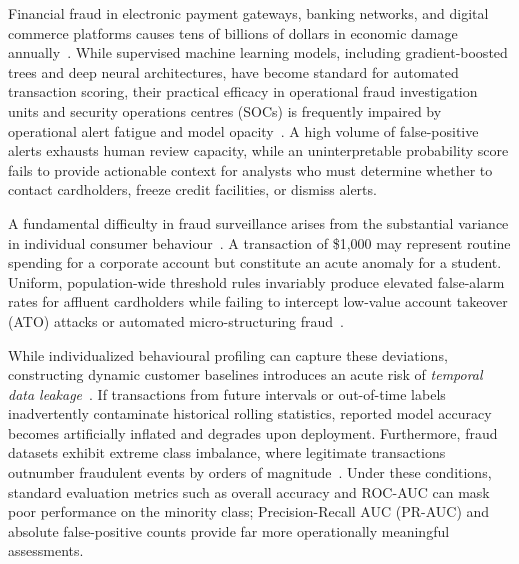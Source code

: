 \documentclass[conference]{IEEEtran}
\begin{document}
Financial fraud in electronic payment gateways, banking networks, and digital commerce platforms causes tens of billions of dollars in economic damage annually~\cite{sarna2026ai}. While supervised machine learning models, including gradient-boosted trees and deep neural architectures, have become standard for automated transaction scoring, their practical efficacy in operational fraud investigation units and security operations centres (SOCs) is frequently impaired by operational alert fatigue and model opacity~\cite{lipton2016mythos,chan2015using}. A high volume of false-positive alerts exhausts human review capacity, while an uninterpretable probability score fails to provide actionable context for analysts who must determine whether to contact cardholders, freeze credit facilities, or dismiss alerts.

A fundamental difficulty in fraud surveillance arises from the substantial variance in individual consumer behaviour~\cite{bolton2002unsupervised}. A transaction of \$1,000 may represent routine spending for a corporate account but constitute an acute anomaly for a student. Uniform, population-wide threshold rules invariably produce elevated false-alarm rates for affluent cardholders while failing to intercept low-value account takeover (ATO) attacks or automated micro-structuring fraud~\cite{fetaji2025ai}.

While individualized behavioural profiling can capture these deviations, constructing dynamic customer baselines introduces an acute risk of \textit{temporal data leakage}~\cite{jurgovsky2018sequence}. If transactions from future intervals or out-of-time labels inadvertently contaminate historical rolling statistics, reported model accuracy becomes artificially inflated and degrades upon deployment. Furthermore, fraud datasets exhibit extreme class imbalance, where legitimate transactions outnumber fraudulent events by orders of magnitude~\cite{damanik2025advanced,zheng2025integrated}. Under these conditions, standard evaluation metrics such as overall accuracy and ROC-AUC can mask poor performance on the minority class; Precision-Recall AUC (PR-AUC) and absolute false-positive counts provide far more operationally meaningful assessments.
\end{document}

